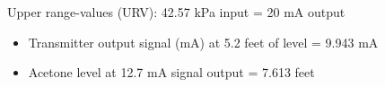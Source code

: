 \vskip 10pt

Upper range-values (URV): 42.57 kPa input = 20 mA output

\vskip 10pt

\begin{itemize}
\item{} Transmitter output signal (mA) at 5.2 feet of level = 9.943 mA
\item{} Acetone level at 12.7 mA signal output = 7.613 feet
\end{itemize}











